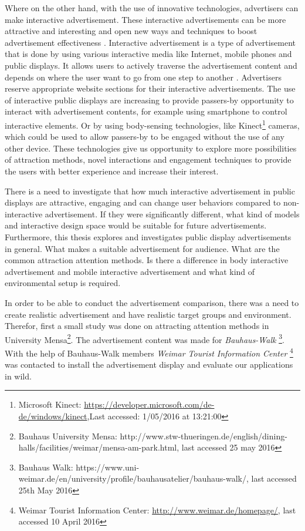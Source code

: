 Where on the other hand, with the use of innovative technologies, advertisers can make interactive advertisement. These interactive advertisements can be more attractive and interesting and open new ways and techniques to boost advertisement effectiveness \cite{add_effectivenss}. Interactive advertisement is a type of advertisement that is done by using various interactive media like Internet, mobile phones and public displays. It allows users to actively traverse the advertisement content and depends on where the user want to go from one step to another \cite{Non_inter_vs_interAd}. Advertisers reserve appropriate website sections for their interactive advertisements. The use of interactive public displays are increasing to provide passers-by opportunity to interact with advertisement contents, for example using smartphone to control interactive elements. Or by using body-sensing technologies, like Kinect\footnote{Microsoft Kinect: \url{https://developer.microsoft.com/de-de/windows/kinect},Last accessed: 1/05/2016 at 13:21:00} cameras, which could be used to allow passers-by to be engaged without the use of any other device. These technologies give us opportunity to explore more possibilities of attraction methods, novel interactions and engagement techniques to provide the users with better experience and increase their interest. 

There is a need to investigate that how much interactive advertisement in public displays are attractive, engaging and can change user behaviors compared to non-interactive advertisement. If they were significantly different, what kind of models and interactive design space would be suitable for future advertisements. Furthermore, this thesis explores and investigates public display advertisements in general. What makes a suitable advertisement for audience. What are the common attraction attention methods. Is there a difference in body interactive advertisement and mobile interactive advertisement and what kind of environmental setup is required.

In order to be able to conduct the advertisement comparison, there was a need to create realistic advertisement and have realistic target groups and environment. Therefor, first a small study was done on attracting attention methods in University Mensa\footnote{Bauhaus University Mensa: http://www.stw-thueringen.de/english/dining-halls/facilities/weimar/mensa-am-park.html, last accessed 25 may 2016}. The advertisement content was made for \emph{Bauhaus-Walk} \footnote{Bauhaus Walk: https://www.uni-weimar.de/en/university/profile/bauhausatelier/bauhaus-walk/, last accessed 25th May 2016}. With the help of Bauhaus-Walk members \emph{Weimar Tourist Information Center} \footnote{Weimar Tourist Information Center: \url{http://www.weimar.de/homepage/}, last accessed 10 April 2016} was contacted to install the advertisement display and evaluate our applications in wild.


